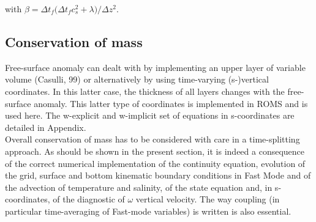 \documentclass[a4paper]{article}
\numberwithin{equation}{section}
\begin{document}
  with $\beta=\Delta{t_f}\big(\Delta{t_f}c_s^2+\lambda\big)/\Delta z^2$.
    

  \subsection{Conservation of mass}
  \label{Subsec_mass}
  Free-surface anomaly can dealt with by implementing an upper layer of variable volume (Casulli, 99) or alternatively by using time-varying (s-)vertical coordinates. In this latter case, the thickness of all layers changes with the free-surface anomaly. This latter type of coordinates is implemented in ROMS and is used here. The w-explicit and w-implicit set of equations in s-coordinates are detailed in Appendix.\\
  
  Overall conservation of mass has to be considered with care in a time-splitting approach. As should be shown in the present section, it is indeed a consequence of the correct numerical implementation of the continuity equation, evolution of the grid, surface and bottom kinematic boundary conditions in Fast Mode and of the advection of temperature and salinity, of the state equation and, in s-coordinates, of the diagnostic of $\omega$ vertical velocity. The way coupling (in particular time-averaging of Fast-mode variables) is written is also essential.\\
  
\end{document}

